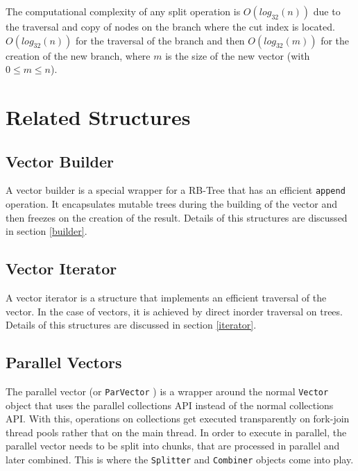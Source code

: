 The computational complexity of any split operation is $O(log_{32}(n))$ due to the traversal and copy of nodes on the branch where the cut index is located. $O(log_{32}(n))$ for the traversal of the branch and then $O(log_{32}(m))$ for the creation of the new branch, where $m$ is the size of the new vector (with $0\leq m \leq n$).



\section{Related Structures}

\subsection{Vector Builder}
A vector builder is a special wrapper for a RB-Tree that has an efficient \texttt{append} operation. It encapsulates mutable trees during the building of the vector and then freezes on the creation of the result. Details of this structures are discussed in section \ref{builder}.

\subsection{Vector Iterator}
A vector iterator is a structure that implements an efficient traversal of the vector. In the case of vectors, it is achieved by direct inorder traversal on trees. Details of this structures are discussed in section \ref{iterator}.

\subsection{Parallel Vectors}
The parallel vector (or \texttt{ParVector} \cite{scalaParVector211}) is a wrapper around the normal \texttt{Vector} object that uses the parallel collections API instead of the normal collections API. With this, operations on collections get executed transparently on fork-join thread pools rather that on the main thread. In order to execute in parallel, the parallel vector needs to be split into chunks, that are processed in parallel and later combined. This is where the \texttt{Splitter} and \texttt{Combiner} objects come into play.


